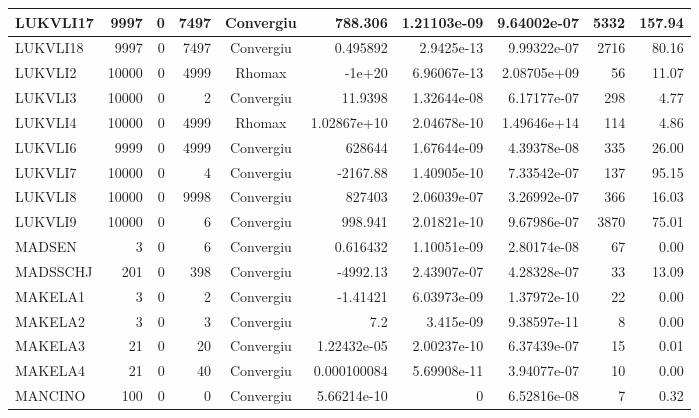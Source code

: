 \begin{center}
\begin{longtable}{|l|r|r|r|c|r|r|r|r|r|}
LUKVLI17 &   9997 &      0 &   7497 & Convergiu  &     788.306 &    1.21103e-09 & 9.64002e-07 &   5332 &  157.94 \\ \hline
LUKVLI18 &   9997 &      0 &   7497 & Convergiu  &    0.495892 &     2.9425e-13 & 9.99322e-07 &   2716 &   80.16 \\ \hline
 LUKVLI2 &  10000 &      0 &   4999 & Rhomax     &      -1e+20 &    6.96067e-13 & 2.08705e+09 &     56 &   11.07 \\ \hline
 LUKVLI3 &  10000 &      0 &      2 & Convergiu  &     11.9398 &    1.32644e-08 & 6.17177e-07 &    298 &    4.77 \\ \hline
 LUKVLI4 &  10000 &      0 &   4999 & Rhomax     & 1.02867e+10 &    2.04678e-10 & 1.49646e+14 &    114 &    4.86 \\ \hline
 LUKVLI6 &   9999 &      0 &   4999 & Convergiu  &      628644 &    1.67644e-09 & 4.39378e-08 &    335 &   26.00 \\ \hline
 LUKVLI7 &  10000 &      0 &      4 & Convergiu  &    -2167.88 &    1.40905e-10 & 7.33542e-07 &    137 &   95.15 \\ \hline
 LUKVLI8 &  10000 &      0 &   9998 & Convergiu  &      827403 &    2.06039e-07 & 3.26992e-07 &    366 &   16.03 \\ \hline
 LUKVLI9 &  10000 &      0 &      6 & Convergiu  &     998.941 &    2.01821e-10 & 9.67986e-07 &   3870 &   75.01 \\ \hline
  MADSEN &      3 &      0 &      6 & Convergiu  &    0.616432 &    1.10051e-09 & 2.80174e-08 &     67 &    0.00 \\ \hline
MADSSCHJ &    201 &      0 &    398 & Convergiu  &    -4992.13 &    2.43907e-07 & 4.28328e-07 &     33 &   13.09 \\ \hline
 MAKELA1 &      3 &      0 &      2 & Convergiu  &    -1.41421 &    6.03973e-09 & 1.37972e-10 &     22 &    0.00 \\ \hline
 MAKELA2 &      3 &      0 &      3 & Convergiu  &         7.2 &      3.415e-09 & 9.38597e-11 &      8 &    0.00 \\ \hline
 MAKELA3 &     21 &      0 &     20 & Convergiu  & 1.22432e-05 &    2.00237e-10 & 6.37439e-07 &     15 &    0.01 \\ \hline
 MAKELA4 &     21 &      0 &     40 & Convergiu  & 0.000100084 &    5.69908e-11 & 3.94077e-07 &     10 &    0.00 \\ \hline
 MANCINO &    100 &      0 &      0 & Convergiu  & 5.66214e-10 &              0 & 6.52816e-08 &      7 &    0.32 \\ \hline

\end{longtable}
\end{center}
